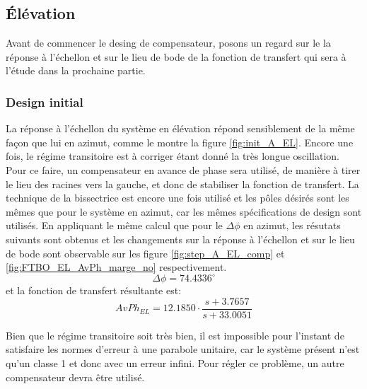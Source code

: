 \documentclass{udes_rapport} %
\begin{document}
\subsection{Élévation}
Avant de commencer le desing de compensateur, posons un regard sur le la réponse à l'échellon et sur le lieu de bode de la fonction de transfert qui sera à l'étude dans la prochaine partie.\\
\subsubsection{Design initial}
La réponse à l'échellon du système en élévation répond sensiblement de la même façon que lui en azimut, comme le montre la figure \ref{fig:init_A_EL}.
Encore une fois, le régime transitoire est à corriger étant donné la très longue oscillation. Pour ce faire, un compensateur en avance de phase sera utilisé, de manière à tirer le lieu des racines vers la gauche, et donc de stabiliser la fonction de transfert. La technique de la bissectrice est encore une fois utilisé et les pôles désirés sont les mêmes que pour le système en azimut, car les mêmes spécifications de design sont utilisés. En appliquant le même calcul que pour le $\Delta \phi$ en azimut, les résutats suivants sont obtenus et les changements sur la réponse à l'échellon et sur le lieu de bode sont observable sur les figure \ref{fig:step_A_EL_comp} et \ref{fig:FTBO_EL_AvPh_marge_no} respectivement.
\[\Delta \phi = 74.4336^\circ\]
et la fonction de transfert résultante est:
\[AvPh_{EL} = 12.1850 \cdot \frac{s+3.7657}{s+33.0051}\]

Bien que le régime transitoire soit très bien, il est impossible pour l'instant de satisfaire les normes d'erreur à une parabole unitaire, car le système présent n'est qu'un classe 1 et donc avec un erreur infini. Pour régler ce problème, un autre compensateur devra être utilisé.
\end{document}
